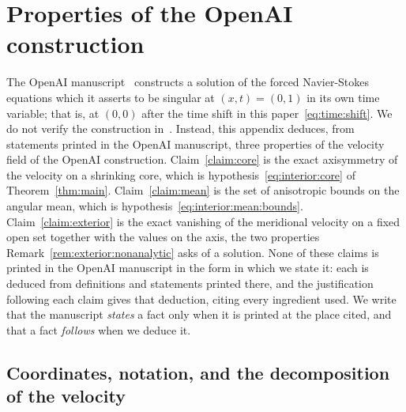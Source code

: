 \documentclass[11pt,reqno]{amsproc}
\numberwithin{equation}{section}
\theoremstyle{remark}
\begin{document}
\appendix
\section{Properties of the OpenAI construction}
\label{app:scales}

The OpenAI manuscript~\cite{OpenAIManuscript} constructs a solution of the forced Navier-Stokes equations which it asserts to be singular at $(x,t)=(0,1)$ in its own time variable; that is, at $(0,0)$ after the time shift in this paper~\eqref{eq:time:shift}. We do not verify the construction in~\cite{OpenAIManuscript}. Instead, this appendix deduces, from statements printed in the OpenAI manuscript, three properties of the velocity field of the OpenAI construction. Claim~\ref{claim:core} is the exact axisymmetry of the velocity on a shrinking core, which is hypothesis~\eqref{eq:interior:core} of Theorem~\ref{thm:main}. Claim~\ref{claim:mean} is the set of anisotropic bounds on the angular mean, which is hypothesis~\eqref{eq:interior:mean:bounds}. Claim~\ref{claim:exterior} is the exact vanishing of the meridional velocity on a fixed open set together with the values on the axis, the two properties Remark~\ref{rem:exterior:nonanalytic} asks of a solution. None of these claims is printed in the OpenAI manuscript in the form in which we state it: each is deduced from definitions and statements printed there, and the justification following each claim gives that deduction, citing every ingredient used. We write that the manuscript \emph{states} a fact only when it is printed at the place cited, and that a fact \emph{follows} when we deduce it.

\subsection{Coordinates, notation, and the decomposition of the velocity}
\label{sec:properties:setup}
\end{document}
